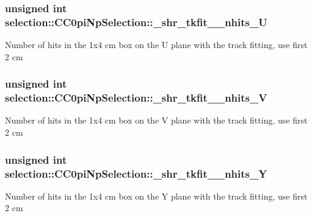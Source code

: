 \subsubsection[{\texorpdfstring{\+\_\+shr\+\_\+tkfit\+\_\+2cm\+\_\+nhits\+\_\+U}{_shr_tkfit_2cm_nhits_U}}]{\setlength{\rightskip}{0pt plus 5cm}unsigned int selection\+::\+C\+C0pi\+Np\+Selection\+::\+\_\+shr\+\_\+tkfit\+\_\+2cm\+\_\+nhits\+\_\+U\hspace{0.3cm}{\ttfamily [private]}}\hypertarget{classselection_1_1CC0piNpSelection_ab659c0c62a77c77e745829478828e100}{}\label{classselection_1_1CC0piNpSelection_ab659c0c62a77c77e745829478828e100}
Number of hits in the 1x4 cm box on the U plane with the track fitting, use first 2 cm 
\subsubsection[{\texorpdfstring{\+\_\+shr\+\_\+tkfit\+\_\+2cm\+\_\+nhits\+\_\+V}{_shr_tkfit_2cm_nhits_V}}]{\setlength{\rightskip}{0pt plus 5cm}unsigned int selection\+::\+C\+C0pi\+Np\+Selection\+::\+\_\+shr\+\_\+tkfit\+\_\+2cm\+\_\+nhits\+\_\+V\hspace{0.3cm}{\ttfamily [private]}}\hypertarget{classselection_1_1CC0piNpSelection_a4d79a5a52fba98286c68079f9a3e04cb}{}\label{classselection_1_1CC0piNpSelection_a4d79a5a52fba98286c68079f9a3e04cb}
Number of hits in the 1x4 cm box on the V plane with the track fitting, use first 2 cm 
\subsubsection[{\texorpdfstring{\+\_\+shr\+\_\+tkfit\+\_\+2cm\+\_\+nhits\+\_\+Y}{_shr_tkfit_2cm_nhits_Y}}]{\setlength{\rightskip}{0pt plus 5cm}unsigned int selection\+::\+C\+C0pi\+Np\+Selection\+::\+\_\+shr\+\_\+tkfit\+\_\+2cm\+\_\+nhits\+\_\+Y\hspace{0.3cm}{\ttfamily [private]}}\hypertarget{classselection_1_1CC0piNpSelection_a267f9073fa07d7c1c5e40b79a935c585}{}\label{classselection_1_1CC0piNpSelection_a267f9073fa07d7c1c5e40b79a935c585}
Number of hits in the 1x4 cm box on the Y plane with the track fitting, use first 2 cm 
